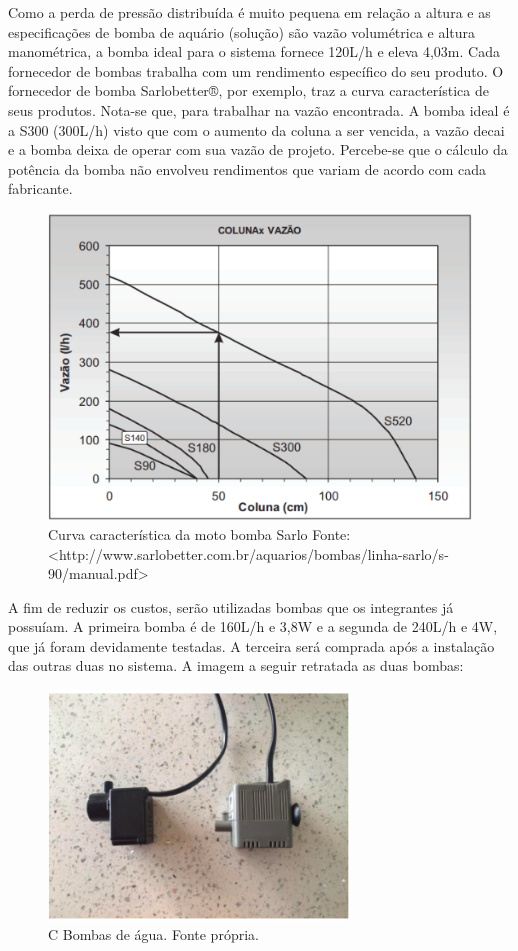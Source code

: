 Como a perda de pressão distribuída é muito pequena em relação a altura e as especificações de bomba de aquário (solução) são vazão volumétrica e altura manométrica, a bomba ideal para o sistema fornece 120L/h e eleva 4,03m. Cada fornecedor de bombas trabalha com um rendimento específico do seu produto. O fornecedor de bomba Sarlobetter®, por exemplo, traz a curva característica de seus produtos. Nota-se que, para trabalhar na vazão encontrada. A bomba ideal é a S300 (300L/h) visto que com o aumento da coluna a ser vencida, a vazão decai e a bomba deixa de operar com sua vazão de projeto.  
Percebe-se que o cálculo da potência da bomba não envolveu rendimentos que variam de acordo com cada fabricante.
 

\begin{figure}[H]
	\centering
	\includegraphics[width=13cm]{figuras/coluna.png}
	\caption{Curva característica da moto bomba Sarlo  Fonte: <http://www.sarlobetter.com.br/aquarios/bombas/linha-sarlo/s-90/manual.pdf>}
	\label{coluna}
\end{figure}

A fim de reduzir os custos, serão utilizadas bombas que os integrantes já possuíam. A primeira bomba é de 160L/h e 3,8W e a segunda de 240L/h e 4W, que já foram devidamente testadas. A terceira será comprada após a instalação das outras duas no sistema. A imagem a seguir retratada as duas bombas:

\begin{figure}[H]
	\centering
	\includegraphics[width=8cm]{figuras/bombas.png}
	\caption{C Bombas de água. Fonte própria.}
	\label{coluna}
\end{figure}

